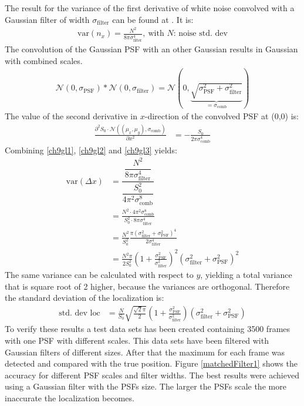 The result for the variance of the first derivative of white noise convolved with a Gaussian filter of width $\sigma_\text{filter}$ can be found at \cite{ulli}. It is:
\begin{align}
	\text{var}(n_x) = \frac{N^2}{8\pi\sigma_\text{filter}^4},~\text{with }N\text{: noise std. dev} \label{ch9gl2}
\end{align}
The convolution of the Gaussian PSF  with an other Gaussian results in Gaussian with combined scales.
\begin{align}
 \mathcal{N}(0,\sigma_\text{PSF}) \ast \mathcal{N}(0,\sigma_\text{filter}) = \mathcal{N}\left(0,\underbrace{\sqrt{\sigma_\text{PSF}^2+\sigma_\text{filter}^2}}_{=\sigma_\text{comb}}\right)
\end{align}
The value of the second derivative in $x$-direction of the convolved PSF at (0,0) is:
\begin{align}
 \frac{\partial^2 S_0\cdot\mathcal{N}\left((\mu_x,\mu_y),\sigma_\text{comb}\right)}{\partial x^2}  &=  -\frac{S_0}{2\pi \sigma_\text{comb}^4}  \label{ch9gl3}
\end{align}
Combining \ref{ch9gl1}, \ref{ch9gl2} and \ref{ch9gl3} yields:
\begin{align}
\text{var}\left(\Delta x\right) &= \dfrac{\dfrac{N^2}{8\pi\sigma_\text{filter}^4}}{\dfrac{S_0^2}{4\pi^2 \sigma_\text{comb}^8}}\\
&= \frac{N^2\cdot 4\pi^2 \sigma_\text{comb}^8}{S_0^2\cdot8\pi\sigma_\text{filter}^4}\\
&= \frac{N^2}{S_0^2} \frac{\pi \left(\sigma_\text{filter}^2+\sigma_\text{PSF}^2\right)^4}{2\sigma_\text{filter}^4}\\
&= \frac{N^2\pi}{2S_0^2} \left(1+\frac{\sigma_\text{PSF}^2}{\sigma_\text{filter}^2}\right)^2\left(\sigma_\text{filter}^2+\sigma_\text{PSF}^2\right)^2 
\end{align}
The same variance can be calculated with respect to $y$, yielding a total variance that is square root of 2 higher, because the variances are orthogonal.
Therefore the standard deviation of the localization is:
\begin{align}
 \text{std. dev loc}&=\frac{N}{S_0}\sqrt{\frac{\sqrt{2}\pi}{2}}
 \left(1+\frac{\sigma_\text{PSF}^2}{\sigma_\text{filter}^2}\right)\left(\sigma_\text{filter}^2+\sigma_\text{PSF}^2\right) 
\end{align}
To verify these results a test data sets has been created containing 3500 frames with one PSF with different scales. This data sets have been filtered with Gaussian filters of different sizes. After that the maximum for each frame was detected and compared with the true position. Figure \ref{matchedFilter1} shows the accuracy for different PSF scales and filter widths.\newline
The best results were achieved using a Gaussian filter with the PSFs size. The larger the PSFs scale the more inaccurate the localization becomes.\newline

